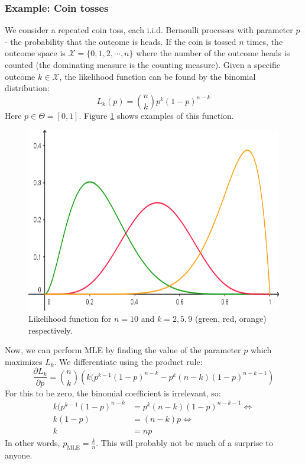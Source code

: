 \documentclass[12pt, a4paper]{article}
\numberwithin{equation}{section}
\begin{document}
\subsubsection{Example: Coin tosses}
We consider a repeated coin toss, each i.i.d. Bernoulli processes with parameter $p$ - the probability that the outcome is heads. If the coin is tossed $n$ times, the outcome space is $\mathcal{X}=\{0, 1, 2,\cdots, n\}$ where the number of the outcome heads is counted (the dominating measure is the counting measure). Given a specific outcome $k\in\mathcal{X}$, the likelihood function can be found by the binomial distribution:
\begin{equation}
L_k(p)=\binom{n}{k}p^k(1-p)^{n-k}
\end{equation}
Here $p\in\Theta=[0,1]$. Figure \ref{fig:binomial_likelihood} shows examples of this function.

\begin{figure}
\centering
\includegraphics[width=.8\textwidth]{binomial_likelihood}
\caption{Likelihood function for $n=10$ and $k=2, 5, 9$ (green, red, orange) respectively.}
\label{fig:binomial_likelihood}
\end{figure}

Now, we can perform MLE by finding the value of the parameter $p$ which maximizes $L_k$. We differentiate using the product rule:
\begin{equation}
\frac{\partial L_k}{\partial p}=\binom{n}{k}\left(k(p^{k-1}(1-p)^{n-k}-p^k(n-k)(1-p)^{n-k-1}\right)
\end{equation}
For this to be zero, the binomial coefficient is irrelevant, so:
\begin{align}
k(p^{k-1}(1-p)^{n-k}&=p^k(n-k)(1-p)^{n-k-1}\Leftrightarrow \\
k(1-p)&=(n-k)p\Leftrightarrow \\
k&=np
\end{align}
In other words, $p_{\textrm{MLE}}=\frac{k}{n}$. This will probably not be much of a surprise to anyone.
\end{document}
